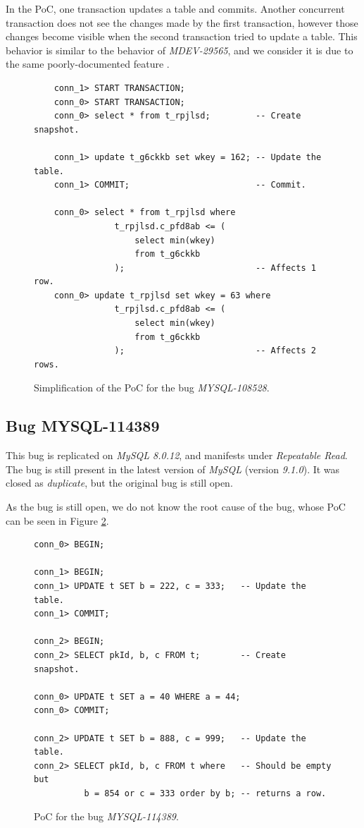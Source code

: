 In the PoC, one transaction updates a table and commits. Another concurrent transaction does not see the changes made by the first transaction, however those changes become visible when the second transaction tried to update a table. This behavior is similar to the behavior of \textit{MDEV-29565}, and we consider it is due to the same poorly-documented feature \cite{mysqlconsistentread}.


\begin{figure}
\begin{verbatim}
    conn_1> START TRANSACTION;
    conn_0> START TRANSACTION;
    conn_0> select * from t_rpjlsd;         -- Create snapshot.

    conn_1> update t_g6ckkb set wkey = 162; -- Update the table.
    conn_1> COMMIT;                         -- Commit.

    conn_0> select * from t_rpjlsd where
                t_rpjlsd.c_pfd8ab <= (
                    select min(wkey)
                    from t_g6ckkb
                );                          -- Affects 1 row.
    conn_0> update t_rpjlsd set wkey = 63 where
                t_rpjlsd.c_pfd8ab <= (
                    select min(wkey)
                    from t_g6ckkb
                );                          -- Affects 2 rows.
\end{verbatim}
\caption{Simplification of the PoC for the bug \textit{MYSQL-108528}.} \label{fig:MYSQL-108528}
\end{figure}



\subsection*{Bug MYSQL-114389}

This bug is replicated on \textit{MySQL 8.0.12}, and manifests under \textit{Repeatable Read}. The bug is still present in the latest version of \textit{MySQL} (version \textit{9.1.0}). It was closed as \textit{duplicate}, but the original bug is still open.

As the bug is still open, we do not know the root cause of the bug, whose PoC can be seen in Figure \ref{fig:MYSQL-114389}.

\begin{figure}
\begin{verbatim}
conn_0> BEGIN;

conn_1> BEGIN;                          
conn_1> UPDATE t SET b = 222, c = 333;   -- Update the table.
conn_1> COMMIT;                         

conn_2> BEGIN;
conn_2> SELECT pkId, b, c FROM t;        -- Create snapshot.

conn_0> UPDATE t SET a = 40 WHERE a = 44;
conn_0> COMMIT;

conn_2> UPDATE t SET b = 888, c = 999;   -- Update the table.
conn_2> SELECT pkId, b, c FROM t where   -- Should be empty but
          b = 854 or c = 333 order by b; -- returns a row.

\end{verbatim}
\caption{PoC for the bug \textit{MYSQL-114389}.} \label{fig:MYSQL-114389}
\end{figure}


